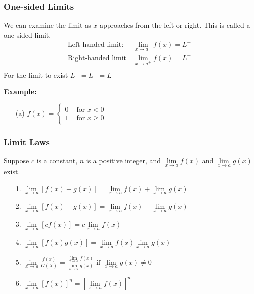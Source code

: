 \documentclass{beamer}
\begin{document}
\begin{frame}
\frametitle{\textbf{One-sided Limits}}
We can examine the limit as $x$ approaches from the left or right. This is called a one-sided limit.
\begin{eqnarray*}
\mbox{Left-handed limit}: & \lim\limits_{x \to a^-} f(x) = L^-\\
\mbox{Right-handed limit}: & \lim\limits_{x \to a^+} f(x) = L^+\\
\end{eqnarray*}
For the limit to exist $L^- = L^+ = L$

\vspace{12pt}

\textbf{Example:}
\begin{itemize}
\item[(a)]
$f(x)=  \begin{cases} 
0 & \mbox{ for } x <0\\
1 & \mbox{ for } x \geq 0
\end{cases}  $
\end{itemize}
\end{frame}

\begin{frame}
\frametitle{\textbf{Limit Laws}}
Suppose $c$ is a constant, $n$ is a positive integer, and $\lim\limits_{x \to a}f(x)$ and $\lim\limits_{x \to a}g(x)$ exist.
\begin{itemize}
	\item[1.] $\lim\limits_{x \to a} [f(x)+g(x)] = \lim\limits_{x \to a}f(x) + \lim\limits_{x \to a}g(x)$
	\item[2.] $\lim\limits_{x \to a} [f(x)-g(x)] = \lim\limits_{x \to a}f(x) - \lim\limits_{x \to a}g(x)$
	\item[3.]$\lim\limits_{x \to a}[cf(x)] = c\lim\limits_{x \to a}f(x)$
	\item[4.]$\lim\limits_{x \to a}[f(x)g(x)] = \lim\limits_{x \to a}f(x)\lim\limits_{x \to a}g(x)$
	\item[5.]$\lim\limits_{x \to a}\frac{f(x)}{G(X)} = \frac{\lim\limits_{x \to a}f(x)}{\lim\limits_{x \to a}g(x)} \mbox{ if } \lim\limits_{x \to a} g(x) \neq 0$
	\item[6.]$\lim\limits_{x \to a}[f(x)]^n = [\lim\limits_{x \to a}f(x)]^n$
\end{itemize}
\end{frame}
\end{document}
